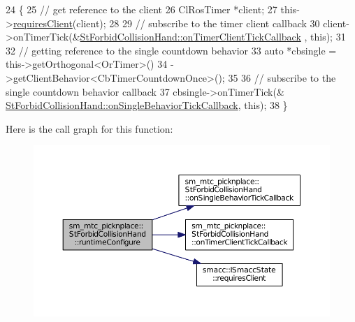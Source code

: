 \begin{DoxyCode}
24     \{
25         \textcolor{comment}{// get reference to the client}
26         ClRosTimer *client;
27         this->\hyperlink{classsmacc_1_1ISmaccState_a7f95c9f0a6ea2d6f18d1aec0519de4ac}{requiresClient}(client);
28 
29         \textcolor{comment}{// subscribe to the timer client callback}
30         client->onTimerTick(&\hyperlink{structsm__mtc__picknplace_1_1StForbidCollisionHand_a29865281e5de9e6c5564561751afbef1}{StForbidCollisionHand::onTimerClientTickCallback}
      , \textcolor{keyword}{this});
31 
32         \textcolor{comment}{// getting reference to the single countdown behavior}
33         \textcolor{keyword}{auto} *cbsingle = this->getOrthogonal<OrTimer>()
34                              ->getClientBehavior<CbTimerCountdownOnce>();
35 
36         \textcolor{comment}{// subscribe to the single countdown behavior callback}
37         cbsingle->onTimerTick(&
      \hyperlink{structsm__mtc__picknplace_1_1StForbidCollisionHand_a91e7e8c18b432aa1f4966adbd2e258f7}{StForbidCollisionHand::onSingleBehaviorTickCallback}, \textcolor{keyword}{
      this});
38     \}
\end{DoxyCode}


Here is the call graph for this function\+:
\nopagebreak
\begin{figure}[H]
\begin{center}
\leavevmode
\includegraphics[width=350pt]{structsm__mtc__picknplace_1_1StForbidCollisionHand_abfe10c26242d1d87fcf063b7cf8839c1_cgraph}
\end{center}
\end{figure}


